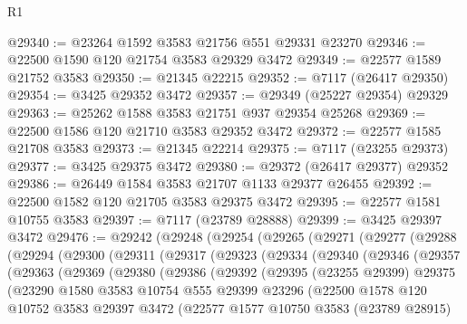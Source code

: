 \begin{lexlean}{R1}
\begin{coremodule}
@29340 := @23264 @1592 @3583 @21756 @551 @29331 @23270
@29346 := @22500 @1590 @120 @21754 @3583 @29329 @3472
@29349 := @22577 @1589 @21752 @3583
@29350 := @21345 @22215
@29352 := @7117 (@26417 @29350)
@29354 := @3425 @29352 @3472
@29357 := @29349 (@25227 @29354) @29329
@29363 := @25262 @1588 @3583 @21751 @937 @29354 @25268
@29369 := @22500 @1586 @120 @21710 @3583 @29352 @3472
@29372 := @22577 @1585 @21708 @3583
@29373 := @21345 @22214
@29375 := @7117 (@23255 @29373)
@29377 := @3425 @29375 @3472
@29380 := @29372 (@26417 @29377) @29352
@29386 := @26449 @1584 @3583 @21707 @1133 @29377 @26455
@29392 := @22500 @1582 @120 @21705 @3583 @29375 @3472
@29395 := @22577 @1581 @10755 @3583
@29397 := @7117 (@23789 @28888)
@29399 := @3425 @29397 @3472
@29476 := @29242
    (@29248
      (@29254
        (@29265
          (@29271
            (@29277
              (@29288
                (@29294
                  (@29300
                    (@29311
                      (@29317
                        (@29323
                          (@29334
                            (@29340
                              (@29346
                                (@29357
                                  (@29363
                                    (@29369
                                      (@29380
                                        (@29386
                                          (@29392
                                            (@29395
                                              (@23255 @29399)
                                              @29375
                                              (@23290
                                                @1580
                                                @3583
                                                @10754
                                                @555
                                                @29399
                                                @23296
                                                (@22500
                                                  @1578
                                                  @120
                                                  @10752
                                                  @3583
                                                  @29397
                                                  @3472
                                                  (@22577
                                                    @1577
                                                    @10750
                                                    @3583
                                                    (@23789 @28915)

\end{coremodule}
\end{lexlean}
